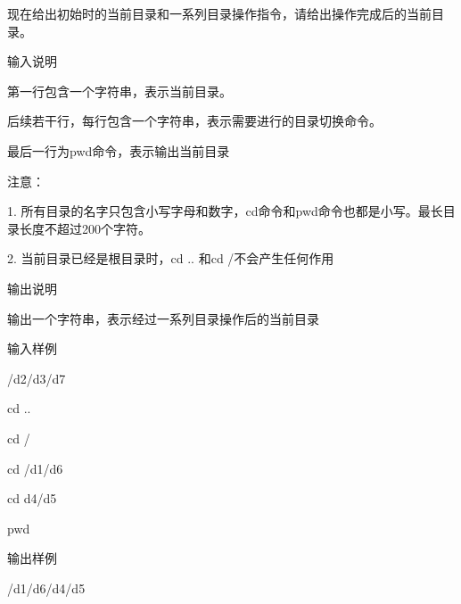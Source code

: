 现在给出初始时的当前目录和一系列目录操作指令，请给出操作完成后的当前目录。

输入说明	

第一行包含一个字符串，表示当前目录。

后续若干行，每行包含一个字符串，表示需要进行的目录切换命令。

最后一行为pwd命令，表示输出当前目录

注意：

1.	所有目录的名字只包含小写字母和数字，cd命令和pwd命令也都是小写。最长目录长度不超过200个字符。

2.	当前目录已经是根目录时，cd .. 和cd /不会产生任何作用

输出说明
	
输出一个字符串，表示经过一系列目录操作后的当前目录

输入样例	

/d2/d3/d7

cd ..

cd /

cd /d1/d6

cd d4/d5

pwd

输出样例
	
/d1/d6/d4/d5

